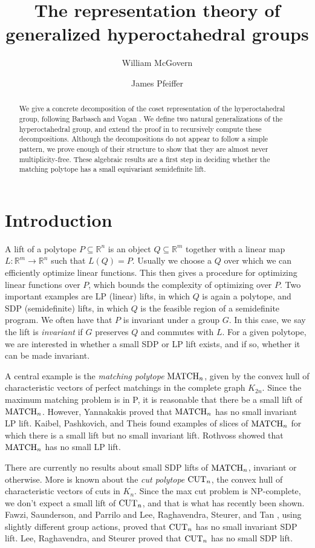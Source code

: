 \documentclass[12pt]{amsart}
\title{The representation theory of generalized hyperoctahedral groups}
\author{William McGovern}
\author{James Pfeiffer}
\numberwithin{theorem}{section}
\newcommand{\RR}{\mathbb{R}}
\newcommand{\MATCH}{\textup{MATCH}}
\newcommand{\CUT}{\textup{CUT}}
\begin{document}
\begin{abstract}
We give a concrete decomposition of the coset representation of the hyperoctahedral group, following Barbasch and Vogan \cite{bv}.
We define two natural generalizations of the hyperoctahedral group, and extend the proof in \cite{bv} to recursively compute these decompositions.
Although the decompositions do not appear to follow a simple pattern, we prove enough of their structure to show that they are almost never multiplicity-free.
These algebraic results are a first step in deciding whether the matching polytope has a small equivariant semidefinite lift.
\end{abstract}
\maketitle

\section{Introduction} \label{BV:Introduction}
A lift of a polytope $P \subseteq \RR^n$ is an object $Q \subseteq \RR^m$ together with a linear map $L: \RR^m \to \RR^n$ such that $L(Q) = P$.
Usually we choose a $Q$ over which we can efficiently optimize linear functions.
This then gives a procedure for optimizing linear functions over $P$, which bounds the complexity of optimizing over $P$.
Two important examples are LP (linear) lifts, in which $Q$ is again a polytope, and SDP (semidefinite) lifts, in which $Q$ is the feasible region of a semidefinite program.
We often have that $P$ is invariant under a group $G$.
In this case, we say the lift is {\em invariant} if $G$ preserves $Q$ and commutes with $L$.
For a given polytope, we are interested in whether a small SDP or LP lift exists, and if so, whether it can be made invariant.

A central example is the {\em matching polytope} $\MATCH_n$, given by the convex hull of characteristic vectors of perfect matchings in the complete graph $K_{2n}$.
Since the maximum matching problem is in P, it is reasonable that there be a small lift of $\MATCH_n$.
However, Yannakakis \cite{yannakakis1988expressing} proved that $\MATCH_n$ has no small invariant LP lift.
Kaibel, Pashkovich, and Theis \cite{kaibel2010symmetry} found examples of slices of $\MATCH_n$ for which there is a small lift but no small invariant lift.
Rothvoss \cite{rothvoss2013matching} showed that $\MATCH_n$ has no small LP lift.

There are currently no results about small SDP lifts of $\MATCH_n$, invariant or otherwise.
More is known about the {\em cut polytope} $\CUT_n$, the convex hull of characteristic vectors of cuts in $K_{n}$.
Since the max cut problem is NP-complete, we don't expect a small lift of $\CUT_n$, and that is what has recently been shown.
Fawzi, Saunderson, and Parrilo \cite{fawzi2014equivariant} and Lee, Raghavendra, Steurer, and Tan \cite{lee2014power}, using slightly different group actions, proved that $\CUT_n$ has no small invariant SDP lift.
Lee, Raghavendra, and Steurer \cite{lee2014lower} proved that $\CUT_n$ has no small SDP lift.
\end{document}
